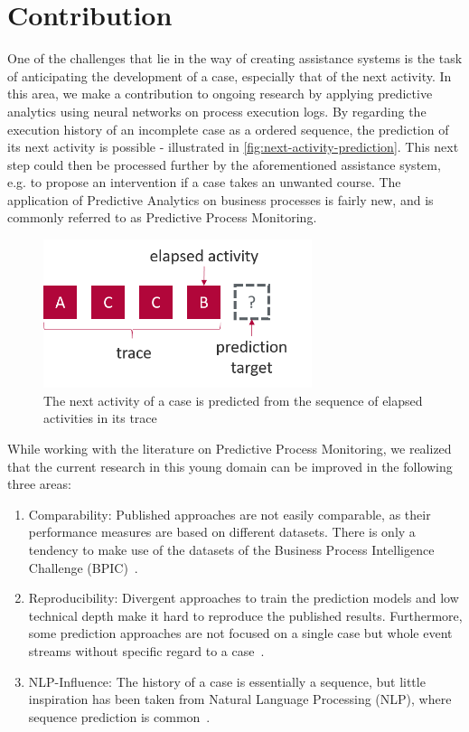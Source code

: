 \section{Contribution}\label{sec:intro:contribution}
One of the challenges that lie in the way of creating assistance systems is the task of anticipating the development of a case, especially that of the next activity. In this area, we make a contribution to ongoing research by applying predictive analytics using neural networks on process execution logs. By regarding the execution history of an incomplete case as a ordered sequence, the prediction of its next activity is possible - illustrated in \autoref{fig:next-activity-prediction}. This next step could then be processed further by the aforementioned assistance system, e.g. to propose an intervention if a case takes an unwanted course. The application of Predictive Analytics on business processes is fairly new, and is commonly referred to as Predictive Process Monitoring.\\

\begin{figure}
    \centering
    \includegraphics[width=0.7\textwidth]{gfx/next-activity.png}
    \caption[Next-activity prediction from a trace]{The next activity of a case is predicted from the sequence of elapsed activities in its trace}
    \label{fig:next-activity-prediction}
\end{figure}

While working with the literature on Predictive Process Monitoring, we realized that the current research in this young domain can be improved in the following three areas:

\begin{enumerate}
    \item Comparability: Published approaches are not easily comparable, as their performance measures are based on different datasets. There is only a tendency to make use of the datasets of the Business Process Intelligence Challenge (BPIC)~\cite{BPIC2011, BPIC2012, BPIC2015, BPIC2017}.
    \item Reproducibility: Divergent approaches to train the prediction models and low technical depth make it hard to reproduce the published results. Furthermore, some prediction approaches are not focused on a single case but whole event streams without specific regard to a case~\cite{evermann2016, schoenig2018}.
    \item NLP-Influence: The history of a case is essentially a sequence, but little inspiration has been taken from Natural Language Processing (NLP), where sequence prediction is common~\cite{shibata2016bipartite}.
\end{enumerate}

